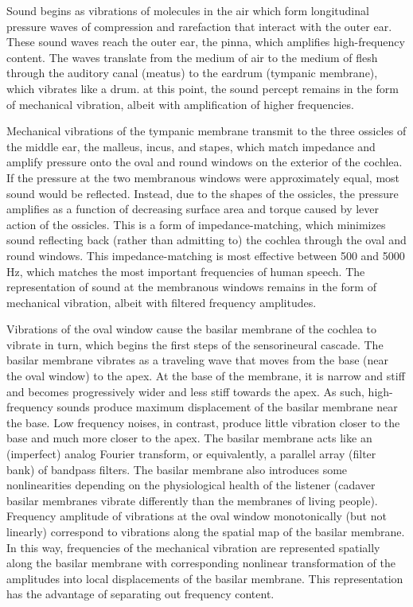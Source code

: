 \documentclass[11pt]{diazessay} %
\begin{document}
Sound begins as vibrations of molecules in the air
which form longitudinal pressure waves
of compression and rarefaction that interact with the outer ear.
These sound waves reach the outer ear, the pinna,
which amplifies high-frequency content. 
The waves translate from the medium of air to the medium
of flesh through the auditory canal (meatus)
to the eardrum (tympanic membrane), which vibrates like a drum.
at this point, the sound percept remains in the form
of mechanical vibration, albeit
with amplification of higher frequencies.

Mechanical vibrations of the tympanic membrane transmit
to the three ossicles of the middle ear, the malleus, incus, and stapes,
which match impedance and amplify pressure onto the oval and round
windows on the exterior of the cochlea.
If the pressure at the two membranous windows were approximately equal,
most sound would be reflected.
Instead, due to the shapes of the ossicles,
the pressure amplifies as a function of decreasing surface area
and torque caused by lever action of the ossicles. 
This is a form of impedance-matching, which minimizes sound reflecting
back (rather than admitting to) the cochlea through the oval and round windows.
This impedance-matching is most effective between 500 and 5000 Hz,
which matches the most important frequencies of human speech.
The representation of sound at the membranous windows
remains in the form of mechanical vibration,
albeit with filtered frequency amplitudes.

Vibrations of the oval window cause the basilar membrane of the cochlea
to vibrate in turn, which begins the first steps of the sensorineural cascade.
The basilar membrane vibrates as a traveling wave that moves
from the base (near the oval window) to the apex.
At the base of the membrane, it is narrow and stiff
and becomes progressively wider and less stiff towards the apex.
As such, high-frequency sounds produce maximum displacement
of the basilar membrane near the base.
Low frequency noises, in contrast, produce little vibration closer to the base
and much more closer to the apex.
The basilar membrane acts like an (imperfect) analog Fourier transform,
or equivalently, a parallel array (filter bank) of bandpass filters.
The basilar membrane also introduces some nonlinearities
depending on the physiological health of the listener
(cadaver basilar membranes vibrate differently than the membranes of living people).
Frequency amplitude of vibrations at the oval window
monotonically (but not linearly) correspond to vibrations along the spatial map
of the basilar membrane.
In this way, frequencies of the mechanical vibration
are represented spatially along the basilar membrane
with corresponding nonlinear transformation of the amplitudes into
local displacements of the basilar membrane.
This representation has the advantage
of separating out frequency content.
\end{document}
